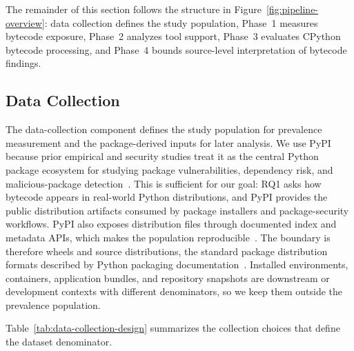 The remainder of this section follows the structure in Figure~\ref{fig:pipeline-overview}: data collection defines the study population, Phase~1 measures bytecode exposure, Phase~2 analyzes tool support, Phase~3 evaluates CPython bytecode processing, and Phase~4 bounds source-level interpretation of bytecode findings.

\subsection{Data Collection}\label{sec:method:data}

The data-collection component defines the study population for prevalence measurement and the package-derived inputs for later analysis.  We use PyPI because prior empirical and security studies treat it as the central Python package ecosystem for studying package vulnerabilities, dependency risk, and malicious-package detection~\cite{duan2021measuring,alfadel2023empirical,gao2025malguard}.  This is sufficient for our goal: RQ1 asks how bytecode appears in real-world Python distributions, and PyPI provides the public distribution artifacts consumed by package installers and package-security workflows.  PyPI also exposes distribution files through documented index and metadata APIs, which makes the population reproducible~\cite{pypi-index-api,pypi-json-api}.  The boundary is therefore wheels and source distributions, the standard package distribution formats described by Python packaging documentation~\cite{python-packaging-flow,python-package-formats}.  Installed environments, containers, application bundles, and repository snapshots are downstream or development contexts with different denominators, so we keep them outside the prevalence population.

Table~\ref{tab:data-collection-design} summarizes the collection choices that define the dataset denominator.


